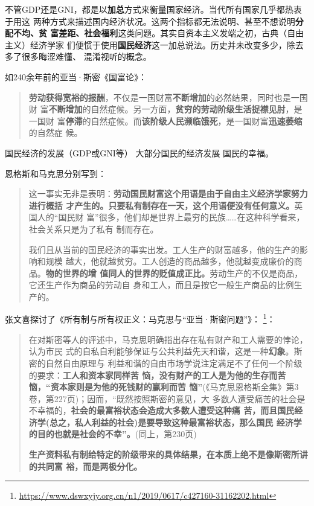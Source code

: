 不管GDP还是GNI，都是以\textbf{加总}方式来衡量国家经济。当代所有国家几乎都热衷于用这
两种方式来描述国内经济状况。这两个指标都无法说明、甚至不想说明\textbf{分配不均、贫
  富差距、社会福利}这类问题。其实自资本主义发端之初，古典（自由主义）经济学家
们便惯于使用\textbf{国民经济}这一加总说法。历史并未改变多少，除去多了很多晦涩难懂、
混淆视听的概念。

如240余年前的亚当·斯密《国富论》：
\begin{quotation}
  \textbf{劳动获得宽裕的报酬}，不仅是一国财富\textbf{不断增加}的必然结果，同时也是一国财
  富\textbf{不断增加}的自然症候。另一方面，\textbf{贫穷的劳动阶级生活捉襟见肘}，是一国财
  富\textbf{停滞}的自然症候。而\textbf{该阶级人民濒临饿死}，是一国财富\textbf{迅速萎缩}的自然症
  候。
\end{quotation}

国民经济的发展（GDP或GNI等） \neq 大部分国民的经济发展 \neq 国民的幸福。

恩格斯和马克思分别写到：
\begin{quotation}
  这一事实无非是表明：\textbf{劳动国民财富这个用语是由于自由主义经济学家努力进行概括
  才产生的。只要私有制存在一天，这个用语便没有任何意义。}英国人的“国民财
  富”很多，他们却是世界上最穷的民族……在这种科学看来，社会关系只是为了私有
  制而存在。\cite[60]{maenwen1}

  我们且从当前的国民经济的事实出发。工人生产的财富越多，他的生产的影响和规模
  越大，他就越贫穷。工人创造的商品越多，他就越变成廉价的商品。\textbf{物的世界的增
    值同人的世界的贬值成正比。}劳动生产的不仅是商品，它还生产作为商品的劳动自
  身和工人，而且是按它一般生产商品的比例生产的。\cite[156]{maenwen1}
\end{quotation}

张文喜探讨了《所有制与所有权正义：马克思与“亚当·斯密问题”》\cite{ZXYJ201404002}：
\footnote{\url{https://www.dswxyjy.org.cn/n1/2019/0617/c427160-31162202.html}}：
\begin{quotation}
  在对斯密等人的评述中，马克思明确指出存在私有财产和工人需要的悖论，认为市民
  式的自私自利能够保证与公共利益先天和谐，这是一种\textbf{幻象}。斯密的自然自由原理与
  利益和谐的自由市场学说注定满足不了任何一个阶级的要求：\textbf{工人和资本家同样苦
    恼，没有财产的工人是为他的生存而苦恼，“资本家则是为他的死钱财的赢利而苦
    恼”}(《马克思恩格斯全集》第3卷，第227页)；因而，“既然按照斯密的意见，大
  多数人遭受痛苦的社会是不幸福的，\textbf{社会的最富裕状态会造成大多数人遭受这种痛
    苦，而且国民经济学(总之，私人利益的社会)是要导致这种最富裕状态，那么国民
    经济学的目的也就是社会的不幸”。}(同上，第230页)

  \textbf{生产资料私有制给特定的阶级带来的具体结果，在本质上绝不是像斯密所讲的共同富
  裕，而是两极分化。}
\end{quotation}

